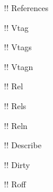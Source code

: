 \documentclass[10pt,a4paper]{article}
\begin{document}
\ttfamily
!\gitReferences ! References

!\gitVtag ! Vtag

!\gitVtags ! Vtags

!\gitVtagn ! Vtagn

!\gitRel ! Rel

!\gitRels ! Rels

!\gitReln ! Reln

!\gitDescribe ! Describe

!\gitDirty ! Dirty

!\gitRoff ! Roff
\end{document}
